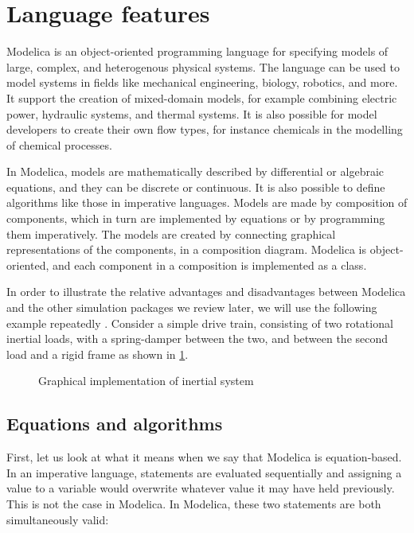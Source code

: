 \documentclass[\rootfolder/main.tex]{subfiles}
\begin{document}
\section{Language features}

Modelica is an object-oriented programming language for specifying models of large, complex, and heterogenous physical systems\cite{clauss2002}.
The language can be used to model systems in fields like mechanical engineering, biology, robotics, and more.
It support the creation of mixed-domain models, for example combining electric power, hydraulic systems, and thermal systems.
It is also possible for model developers to create their own flow types, for instance chemicals in the modelling of chemical processes.

In Modelica, models are mathematically described by differential or algebraic equations, and they can be discrete or continuous.
It is also possible to define algorithms like those in imperative languages.
Models are made by composition of components, which in turn are implemented by equations or by programming them imperatively.
The models are created by connecting graphical representations of the components, in a composition diagram.
Modelica is object-oriented, and each component in a composition is implemented as a class.

In order to illustrate the relative advantages and disadvantages between Modelica and the other simulation packages we review later, we will use the following example repeatedly \footnotemark.
Consider a simple drive train, consisting of two rotational inertial loads, with a spring-damper between the two, and between the second load and a rigid frame as shown in \cref{fig:inertial}.


\begin{figure}[ht]
    \caption{Graphical implementation of inertial system}
    \label{fig:inertial}
\end{figure}

\subsection{Equations and algorithms}

First, let us look at what it means when we say that Modelica is equation-based.
In an imperative language, statements are evaluated sequentially and assigning a value to a variable would overwrite whatever value it may have held previously.
This is not the case in Modelica.
In Modelica, these two statements are both simultaneously valid:
\end{document}
